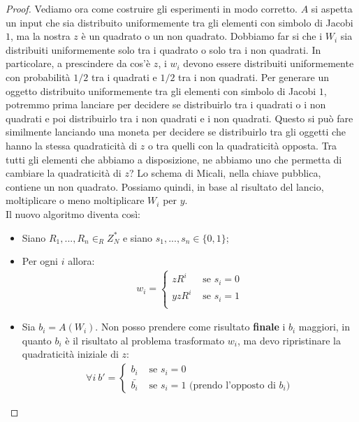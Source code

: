 \begin{proof}
Vediamo ora come costruire gli esperimenti in modo corretto. $A$ si aspetta un input che sia distribuito uniformemente tra gli elementi con simbolo di Jacobi $1$, ma la nostra $z$ è un quadrato o un non quadrato. Dobbiamo far si che i $W_i$ sia distribuiti uniformemente solo tra i quadrato o solo tra i non quadrati. In particolare, a prescindere da cos'è $z$, i $w_i$ devono essere distribuiti uniformemente con probabilità $1/2$ tra i quadrati e $1/2$ tra i non quadrati. Per generare un oggetto distribuito uniformemente tra gli elementi con simbolo di Jacobi $1$, potremmo prima lanciare per decidere se distribuirlo tra i quadrati o i non quadrati e poi distribuirlo tra i non quadrati e i non quadrati. Questo si può fare similmente lanciando una moneta per decidere se distribuirlo tra gli oggetti che hanno la stessa quadraticità di $z$ o tra quelli con la quadraticità opposta. Tra tutti gli elementi che abbiamo a disposizione, ne abbiamo uno che permetta di cambiare la quadraticità di $z$? Lo schema di Micali, nella chiave pubblica, contiene un non quadrato. Possiamo quindi, in base al risultato del lancio, moltiplicare o meno moltiplicare $W_i$ per $y$.\\

\noindent Il nuovo algoritmo diventa così:
\begin{itemize}
    \item Siano $R_1, ..., R_n \in_R Z_N^*$ e siano $s_1, ..., s_n \in \{0, 1\}$;
    \item Per ogni $i$ allora:
    \begin{align*}
        w_i = \begin{cases}
                zR^i & \text{ se } s_i = 0\\
                yzR^i & \text{ se } s_i = 1\\
        \end{cases}
    \end{align*}
    \item Sia $b_i = A(W_i)$. Non posso prendere come risultato \textbf{finale} i $b_i$ maggiori, in quanto $b_i$ è il risultato al problema trasformato $w_i$, ma devo ripristinare la quadraticità iniziale di $z$:
    \begin{align*}
        \forall i \ b' = \begin{cases}
                b_i & \text{ se } s_i = 0\\
                \bar{b_i}  & \text{ se } s_i = 1 \text{ (prendo l'opposto di $b_i$)}
        \end{cases}
    \end{align*}
\end{itemize}


\end{proof}
